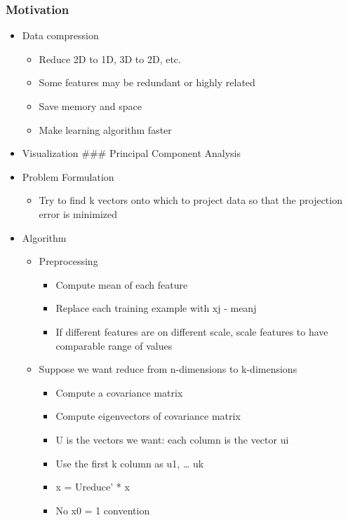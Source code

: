 \documentclass[]{article}
\providecommand{\tightlist}{%
  \setlength{\itemsep}{0pt}\setlength{\parskip}{0pt}}
\begin{document}
\hypertarget{motivation}{%
\subsubsection{Motivation}\label{motivation}}

\begin{itemize}
\tightlist
\item
  Data compression

  \begin{itemize}
  \tightlist
  \item
    Reduce 2D to 1D, 3D to 2D, etc.
  \item
    Some features may be redundant or highly related
  \item
    Save memory and space
  \item
    Make learning algorithm faster
  \end{itemize}
\item
  Visualization \#\#\# Principal Component Analysis
\item
  Problem Formulation

  \begin{itemize}
  \tightlist
  \item
    Try to find k vectors onto which to project data so that the
    projection error is minimized
  \end{itemize}
\item
  Algorithm

  \begin{itemize}
  \tightlist
  \item
    Preprocessing

    \begin{itemize}
    \tightlist
    \item
      Compute mean of each feature
    \item
      Replace each training example with xj - meanj
    \item
      If different features are on different scale, scale features to
      have comparable range of values
    \end{itemize}
  \item
    Suppose we want reduce from n-dimensions to k-dimensions

    \begin{itemize}
    \tightlist
    \item
      Compute a covariance matrix
    \item
      Compute eigenvectors of covariance matrix
    \item
      U is the vectors we want: each column is the vector ui
    \item
      Use the first k column as u1, \ldots{} uk
    \item
      x = Ureduce' * x
    \item
      No x0 = 1 convention
    \end{itemize}
  \end{itemize}
\end{itemize}
\end{document}
